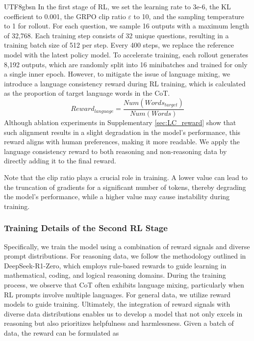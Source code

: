\documentclass[11pt, a4paper, logo, copyright, nonumbering]{deepseek}
\renewcommand{\epsilon}{\varepsilon}
\begin{document}
\begin{CJK*}{UTF8}{gbsn}
In the first stage of RL, we set the learning rate to 3e-6, the KL coefficient to 0.001, the GRPO clip ratio $\epsilon$ to 10, and the sampling temperature to 1 for rollout. For each question, we sample 16 outputs with a maximum length of 32,768. Each training step consists of 32 unique questions, resulting in a training batch size of 512 per step. Every 400 steps, we replace the reference model with the latest policy model. To accelerate training, each rollout generates 8,192 outputs, which are randomly split into 16 minibatches and trained for only a single inner epoch. However, to mitigate the issue of language mixing, we introduce a language consistency reward during RL training, which is calculated as the proportion of target language words in the CoT. 
\begin{equation}
    Reward_{language} = \frac{Num(Words_{target})}{Num(Words)}
\end{equation}
Although ablation experiments in Supplementary \ref{sec:LC_reward} show that such alignment results in a slight degradation in the model's performance, this reward aligns with human preferences, making it more readable. We apply the language consistency reward to both reasoning and non-reasoning data by directly adding it to the final reward. 

Note that the clip ratio plays a crucial role in training.  A lower value can lead to the truncation of gradients for a significant number of tokens, thereby degrading the model's performance, while a higher value may cause instability during training.

\subsubsection{Training Details of the Second RL Stage }\label{sec: r1-2-rl}
Specifically, we train the model using a combination of reward signals and diverse prompt distributions. For reasoning data, we follow the methodology outlined in DeepSeek-R1-Zero, which employs rule-based rewards to guide learning in mathematical, coding, and logical reasoning domains. During the training process, we observe that CoT often exhibits language mixing, particularly when RL prompts involve multiple languages. 
For general data, we utilize reward models to guide training. Ultimately, the integration of reward signals with diverse data distributions enables us to develop a model that not only excels in reasoning but also prioritizes helpfulness and harmlessness. Given a batch of data, the reward can be formulated as 


\end{CJK*}
\end{document}
